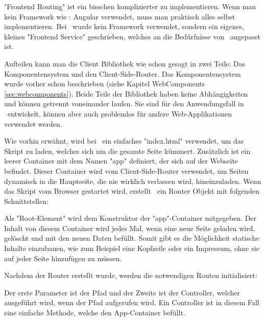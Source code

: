 \label{sec:csrouterimp}

"Frontend Routing" ist ein bisschen komplizierter zu implementieren. Wenn man kein Framework wie \zb: Angular verwendet, muss man praktisch alles selbst implementieren. Bei \ZELIA\ wurde kein Framework verwendet, sondern  ein eigenes, kleines "Frontend Service" geschrieben, welches an die Bedürfnisse von \ZELIA\ angepasst ist.

Aufteilen kann man die Client Bibliothek wie schon gesagt in zwei Teile: Das Komponentensystem und den Client-Side-Router. Das Komponentensystem wurde vorher schon beschrieben (siehe Kapitel WebComponents \ref{sec:webcomponents}). Beide Teile der Bibliothek haben keine Abhängigkeiten und können getrennt voneinander laufen. Sie sind für den Anwendungsfall in \ZELIA\ entwickelt, können aber auch problemlos für andere Web-Applikationen verwendet werden.

Wie vorhin erwähnt, wird bei \ZELIA\ ein einfaches "index.html" verwendet, um das Skript zu laden, welches sich um die gesamte Seite kümmert. Zusätzlich ist ein leerer Container mit dem Namen "app" definiert, der sich auf der Webseite befindet. Dieser Container wird vom Client-Side-Router verwendet, um Seiten dynamisch in die Hauptseite, die nie wirklich verlassen wird, hineinzuladen. Wenn das Skript vom Browser gestartet wird, erstellt \ZELIA\ ein Router Objekt mit folgenden Schnittstellen:


Als "Root-Element" wird dem Konstruktor der "app"-Container mitgegeben. Der Inhalt von diesem Container wird jedes Mal, wenn eine neue Seite geladen wird, gelöscht und mit den neuen Daten befüllt. Somit gibt es die Möglichkeit statische Inhalte einzubauen, wie zum Beispiel eine Kopfzeile oder ein Impressum, ohne sie auf jeder Seite hinzufügen zu müssen.

Nachdem der Router erstellt wurde, werden die notwendigen Routen initialisiert:



Der erste Parameter ist der Pfad und der Zweite ist der Controller, welcher ausgeführt wird, wenn der Pfad aufgerufen wird. Ein Controller ist in diesem Fall eine einfache Methode, welche den App-Container befüllt.


